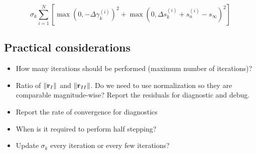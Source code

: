 \documentclass{article}
\begin{document}
\begin{equation}
    \sigma_k \sum_{i=1}^N
    \left[
        \max \left( 0, - \Delta \gamma_k^{(i)}\right) ^ 2 +
        \max \left( 0, \Delta s_k^{(i)} + s_n^{(i)} - s_{\infty}\right) ^ 2
    \right]
\end{equation}

\subsection{Practical considerations}
\begin{itemize}
    \item How many iterations should be performed (maximum number of iterations)?
    \item Ratio of $\|{\bf r}_I\|$ and $\|{\bf r}_{II}\|$. Do we need to use normalization so they are comparable magnitude-wise? Report the residuals for diagnostic and debug.
    \item Report the rate of convergence for diagnostics
    \item When is it required to perform half stepping?
    \item Update $\sigma_k$ every iteration or every few iterations?
\end{itemize}

\end{document}
